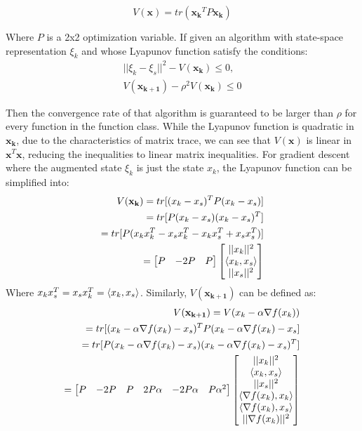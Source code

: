 \begin{equation}
	V(\mathbf{x}) = tr(\mathbf{x_k}^TP\mathbf{x_k}) \label{eqn:Lyapunov}
\end{equation}

Where $P$ is a 2x2 optimization variable. If given an algorithm with state-space representation $\xi _k$ and whose Lyapunov function satisfy the conditions:
\begin{subequations} \label{eqn:Ly_ineq}
	\begin{align}
	  ||\xi _k - \xi _s||^2 - V(\mathbf{x_k}) \leq 0,      \\
	  V(\mathbf{x_{k+1}}) - \rho ^2V(\mathbf{x_k}) \leq 0
	\end{align}
\end{subequations}

Then the convergence rate of that algorithm is guaranteed to be larger than $\rho $ for every function in the function class. While the Lyapunov function is quadratic in $\mathbf{x_k}$, due to the characteristics of matrix trace, we can see that $V(\mathbf{x})$ is linear in $\mathbf{x}^T\mathbf{x}$, reducing the inequalities to linear matrix inequalities. For gradient descent where the augmented state $\xi_k$ is just the state $x_k$, the Lyapunov function can be simplified into:
\begin{subequations}  \label{eqn:Vx}
	\begin{align*}
		V(\mathbf{x_{k}}) = tr[(x_k - x_s)^TP(x_k - x_s)]\\
						  = tr[P(x_k - x_s)(x_k - x_s)^T]\\
						  = tr[P(x_kx_k^T - x_sx_k^T - x_kx_s^T + x_sx_s^T)] \\
						  = \begin{bmatrix}P & -2P & P\end{bmatrix}\begin{bmatrix}||x_k||^2 \\ \langle x_k, x_s \rangle \\ ||x_s||^2\end{bmatrix}
	\end{align*}
\end{subequations}
Where $x_kx_s^T = x_sx_k^T = \langle x_k, x_s \rangle$. Similarly, $V(\mathbf{x_{k+1}})$ can be defined as:
\begin{subequations}  \label{eqn:Vx+}
	\begin{align*}
		V(\mathbf{x_{k+1}}) = V(x_k - \alpha \nabla f(x_k)) \\
						  	= tr[(x_k - \alpha \nabla f(x_k) - x_s)^TP(x_k - \alpha \nabla f(x_k) - x_s]\\
						  	= tr[P(x_k - \alpha \nabla f(x_k) - x_s)(x_k - \alpha \nabla f(x_k) - x_s)^T]\\
						  	= \begin{bmatrix}P & -2P & P & 2P\alpha & -2P\alpha & P\alpha^2\end{bmatrix}\begin{bmatrix}||x_k||^2 \\ \langle x_k, x_s \rangle \\ ||x_s||^2 \\ \langle \nabla f(x_k), x_k \rangle \\ \langle \nabla f(x_k), x_s \rangle \\ ||\nabla f(x_k)||^2\end{bmatrix}
	\end{align*}
\end{subequations}

